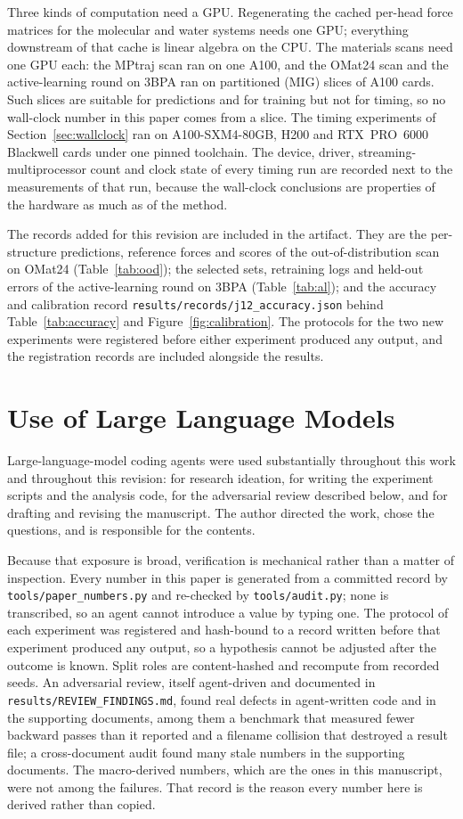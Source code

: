Three kinds of computation need a GPU. Regenerating the cached per-head force
matrices for the molecular and water systems needs one GPU; everything
downstream of that cache is linear algebra on the CPU. The materials scans
need one GPU each: the MPtraj scan ran on one A100, and the OMat24 scan and
the active-learning round on 3BPA ran on partitioned (MIG) slices of A100
cards. Such slices are suitable for predictions and for training but not for
timing, so no wall-clock number in this paper comes from a slice. The timing
experiments of Section~\ref{sec:wallclock} ran on A100-SXM4-80GB, H200 and
RTX~PRO~6000 Blackwell cards under one pinned toolchain. The device, driver,
streaming-multiprocessor count and clock state of every timing run are
recorded next to the measurements of that run, because the wall-clock
conclusions are properties of the hardware as much as of the method.

The records added for this revision are included in the artifact. They are
the per-structure predictions, reference forces and scores of the
out-of-distribution scan on OMat24 (Table~\ref{tab:ood}); the selected sets,
retraining logs and held-out errors of the active-learning round on 3BPA
(Table~\ref{tab:al}); and the accuracy and calibration record
\texttt{results/records/j12\_accuracy.json} behind Table~\ref{tab:accuracy}
and Figure~\ref{fig:calibration}. The protocols for the two new experiments
were registered before either experiment produced any output, and the
registration records are included alongside the results.

\section*{Use of Large Language Models}
\label{sec:llm}

Large-language-model coding agents were used substantially throughout this
work and throughout this revision: for research ideation, for writing the
experiment scripts and the analysis code, for the adversarial review described
below, and for drafting and revising the manuscript. The author directed the
work, chose the questions, and is responsible for the contents.

Because that exposure is broad, verification is mechanical rather than a
matter of inspection. Every number in this paper is generated from a committed
record by \texttt{tools/paper\_numbers.py} and re-checked by
\texttt{tools/audit.py}; none is transcribed, so an agent cannot introduce a
value by typing one. The protocol of each experiment was registered and
hash-bound to a record written before that experiment produced any output, so
a hypothesis cannot be adjusted after the outcome is known. Split roles are
content-hashed and recompute from recorded seeds. An adversarial review,
itself agent-driven and documented in \texttt{results/REVIEW\_FINDINGS.md},
found real defects in agent-written code and in the supporting documents,
among them a benchmark that measured fewer backward passes than it reported
and a filename collision that destroyed a result file; a cross-document audit
found many stale numbers in the supporting documents. The macro-derived
numbers, which are the ones in this manuscript, were not among the failures.
That record is the reason every number here is derived rather than copied.
